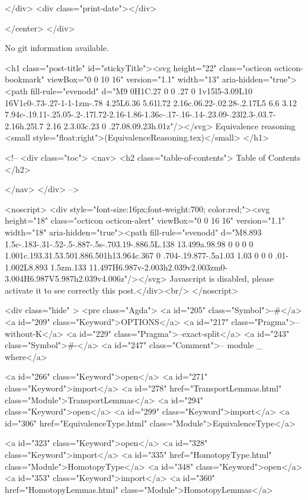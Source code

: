           
        </div>
        <div class="print-date"></div>
        
        
    </center>
  </div>

  
  No git information available.
  

  <h1 class="post-title" id="stickyTitle"><svg height="22" class="octicon octicon-bookmark" viewBox="0 0 10 16" version="1.1" width="13" aria-hidden="true"><path fill-rule="evenodd" d="M9 0H1C.27 0 0 .27 0 1v15l5-3.09L10 16V1c0-.73-.27-1-1-1zm-.78 4.25L6.36 5.61l.72 2.16c.06.22-.02.28-.2.17L5 6.6 3.12 7.94c-.19.11-.25.05-.2-.17l.72-2.16-1.86-1.36c-.17-.16-.14-.23.09-.23l2.3-.03.7-2.16h.25l.7 2.16 2.3.03c.23 0 .27.08.09.23h.01z"/></svg> Equivalence reasoning <small style="float:right">(EquivalenceReasoning.tex)</small>
  </h1>

  <!-- 
  <div class="toc">
    <nav>
    <h2 class="table-of-contents"> Table of Contents </h2>
      

    </nav>
  </div>
   -->

  <noscript>
  <div style="font-size:16px;font-weight:700; color:red;"><svg height="18" class="octicon octicon-alert" viewBox="0 0 16 16" version="1.1" width="18" aria-hidden="true"><path fill-rule="evenodd" d="M8.893 1.5c-.183-.31-.52-.5-.887-.5s-.703.19-.886.5L.138 13.499a.98.98 0 0 0 0 1.001c.193.31.53.501.886.501h13.964c.367 0 .704-.19.877-.5a1.03 1.03 0 0 0 .01-1.002L8.893 1.5zm.133 11.497H6.987v-2.003h2.039v2.003zm0-3.004H6.987V5.987h2.039v4.006z"/></svg> Javascript is disabled, please activate it to see correctly this post.</div><br/>
  </noscript>

  <div class="hide" >
<pre class="Agda">
<a id="205" class="Symbol">{-#</a> <a id="209" class="Keyword">OPTIONS</a> <a id="217" class="Pragma">--without-K</a> <a id="229" class="Pragma">--exact-split</a> <a id="243" class="Symbol">#-}</a>
<a id="247" class="Comment">-- module _ where</a>

<a id="266" class="Keyword">open</a> <a id="271" class="Keyword">import</a> <a id="278" href="TransportLemmas.html" class="Module">TransportLemmas</a>
<a id="294" class="Keyword">open</a> <a id="299" class="Keyword">import</a> <a id="306" href="EquivalenceType.html" class="Module">EquivalenceType</a>

<a id="323" class="Keyword">open</a> <a id="328" class="Keyword">import</a> <a id="335" href="HomotopyType.html" class="Module">HomotopyType</a>
<a id="348" class="Keyword">open</a> <a id="353" class="Keyword">import</a> <a id="360" href="HomotopyLemmas.html" class="Module">HomotopyLemmas</a>

